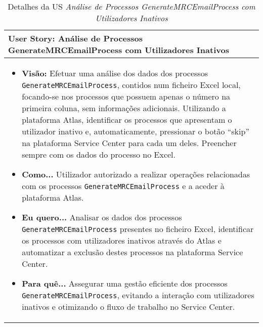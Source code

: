                \begin{table}[htbp] %
                    \centering
                    \begin{tabularx}{1\textwidth}{|>{\raggedright\arraybackslash}X|}
                        \hline
                        \rowcolor{lightgray}
                        \textbf{User Story:} Análise de Processos GenerateMRCEmailProcess com Utilizadores Inativos \\
                        \hline
                        \rowcolor{lightgray!20}
                                        
                        \begin{itemize}
                            \item \textbf{Visão:} Efetuar uma análise dos dados dos processos \texttt{GenerateMRCEmailProcess}, contidos num ficheiro Excel local, focando-se nos processos que possuem apenas o número na primeira coluna, sem informações adicionais. Utilizando a plataforma Atlas, identificar os processos que apresentam o utilizador inativo e, automaticamente, pressionar o botão ``skip'' na plataforma Service Center para cada um deles. Preencher sempre com os dados do processo no Excel.

                            \item \textbf{Como...} Utilizador autorizado a realizar operações relacionadas com os processos \texttt{GenerateMRCEmailProcess} e a aceder à plataforma Atlas.

                            \item \textbf{Eu quero...} Analisar os dados dos processos \texttt{GenerateMRCEmailProcess} presentes no ficheiro Excel, identificar os processos com utilizadores inativos através do Atlas e automatizar a exclusão destes processos na plataforma Service Center.

                            \item \textbf{Para quê...} Assegurar uma gestão eficiente dos processos \texttt{GenerateMRCEmailProcess}, evitando a interação com utilizadores inativos e otimizando o fluxo de trabalho no Service Center.
                        \end{itemize}
                        \\
                        \hline
                    \end{tabularx}
                    \caption{Detalhes da US \textit{Análise de Processos GenerateMRCEmailProcess com Utilizadores Inativos}}\label{table:python_us2}
                \end{table}
                
